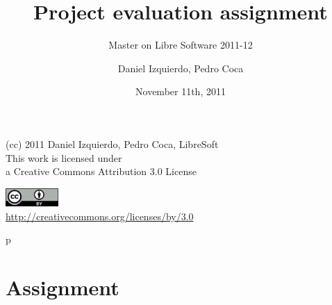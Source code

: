 \documentclass{beamer}
\begin{document}
\title{Project evaluation assignment}
\subtitle{Master on Libre Software 2011-12}
\author{Daniel Izquierdo, Pedro Coca} 
\date{November 11th, 2011}


\begin{frame}
  \vspace{2cm}
  \begin{center}
    {\small (cc) 2011 Daniel Izquierdo, Pedro Coca, LibreSoft} \\
    \medskip
    {\scriptsize This work is licensed under \\ a Creative Commons Attribution 3.0 License}
  \end{center}
  \begin{center}
    \href{http://creativecommons.org/licenses/by/3.0/es}{\includegraphics[width=2cm]{format/cc-by.png}} \\
    {\tiny \url{http://creativecommons.org/licenses/by/3.0}}
  \end{center}
\end{frame}%

\usebackgroundtemplate{}

p
\section{Assignment}
\end{document}
